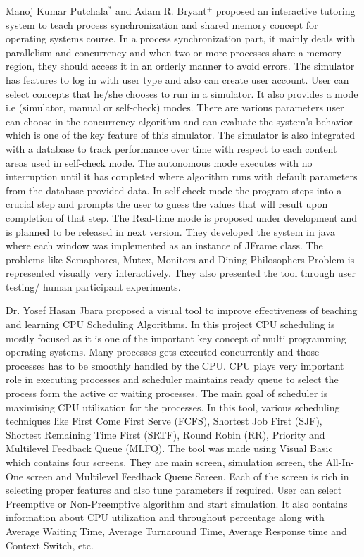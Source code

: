\begin{onehalfspacing}
\par Manoj Kumar Putchala$^*$ and Adam R. Bryant$^+$ \cite{Manoj} proposed an interactive tutoring system to teach process synchronization and shared memory concept for operating systems course. In a process synchronization part, it mainly deals with parallelism and concurrency and when two or more processes share a memory region, they should access it in an orderly manner to avoid errors. The simulator has features to log in with  user type and also can create user account. User can select concepts that he/she chooses to run in a simulator. It also provides a mode i.e (simulator, manual or self-check) modes. There are various parameters user can choose in the concurrency algorithm and can evaluate the system's behavior which is one of the key feature of this simulator. The simulator is also integrated with a database to track performance over time with respect to each content areas used in self-check mode. The autonomous mode executes with no interruption until it has completed where algorithm runs with default parameters from the database provided data. In self-check mode the program steps into a crucial step and prompts the user to guess the values that will result upon completion of that step. The Real-time mode is proposed under development and is planned to be released in next version. They developed the system in java where each window was implemented as an instance of JFrame class. The problems like Semaphores, Mutex, Monitors and Dining Philosophers Problem is represented visually very interactively. They also presented the tool through user testing/ human participant experiments.\newline

\par Dr. Yosef Hasan Jbara \cite{Yosef} proposed a visual tool to improve effectiveness of teaching and learning CPU Scheduling Algorithms. In this project CPU scheduling is mostly focused as it is one of the important key concept of multi programming operating systems. Many processes gets executed concurrently and those processes has to be smoothly handled by the CPU.  CPU plays very important role in executing processes and scheduler maintains ready queue to select the process form the active or waiting processes. The main goal of scheduler is maximising CPU utilization for the processes. In this tool, various scheduling techniques like First Come First Serve (FCFS), Shortest Job First (SJF), Shortest Remaining Time First (SRTF), Round Robin (RR), Priority and Multilevel Feedback Queue (MLFQ). The tool was made using Visual Basic which contains four screens. They are main screen, simulation screen, the All-In-One screen and Multilevel Feedback Queue Screen. Each of the screen is rich in selecting proper features and also tune parameters if required. User can select Preemptive or Non-Preemptive algorithm and start simulation. It also contains information about CPU utilization and throughout percentage along with Average Waiting Time, Average Turnaround Time, Average Response time and Context Switch, etc.\newline


\end{onehalfspacing}
